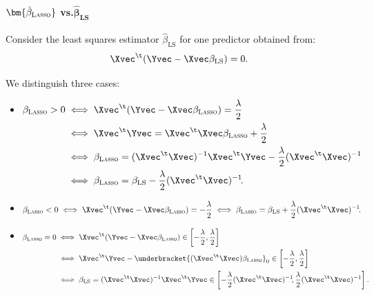 \paragraph{$\bm{\hat{\beta}_{\textsc{Lasso}}}$ vs.\@ $\bm{\hat{\beta}_{\text{LS}}}$}

Consider the least squares estimator $\hat{\beta}_{\text{LS}}$ for one predictor obtained from:
\begin{equation}
    \Xvec^\t(\Yvec - \Xvec\beta_{\text{LS}}) = 0.
\end{equation}

We distinguish three cases:
\begin{itemize}
    \item $\begin{aligned}[t]
                  \beta_{\textsc{Lasso}} > 0 & \iff \Xvec^\t(\Yvec - \Xvec\beta_{\textsc{Lasso}}) = \frac{\lambda}{2}                                    \\
                                             & \iff \Xvec^\t \Yvec = \Xvec^\t \Xvec\beta_{\textsc{Lasso}} + \frac{\lambda}{2}                                \\
                                             & \iff \beta_{\textsc{Lasso}} = (\Xvec^\t \Xvec)^{-1} \Xvec^\t \Yvec - \frac{\lambda}{2} (\Xvec^\t \Xvec)^{-1}        \\
                                             & \iff \beta_{\textsc{Lasso}} = \beta_{\text{LS}} - \frac{\lambda}{2} (\Xvec^\t \Xvec)^{-1}\negthinspace.
              \end{aligned}$
    \item $\begin{aligned}
                  \beta_{\textsc{Lasso}} < 0 & \iff \Xvec^\t(\Yvec - \Xvec\beta_{\textsc{Lasso}}) = -\frac{\lambda}{2} \iff \beta_{\textsc{Lasso}} = \beta_{\text{LS}} + \frac{\lambda}{2} (\Xvec^\t \Xvec)^{-1}\negthinspace.
              \end{aligned}$
    \item $\begin{aligned}[t]
                  \beta_{\textsc{Lasso}} = 0 & \iff \Xvec^\t(\Yvec - \Xvec\beta_{\textsc{Lasso}}) \in \left[-\frac{\lambda}{2}, \frac{\lambda}{2}\right]                                     \\
                                             & \iff \Xvec^\t \Yvec - \underbracket{(\Xvec^\t \Xvec) \beta_{\textsc{Lasso}}}_{0} \in \left[-\frac{\lambda}{2}, \frac{\lambda}{2}\right]           \\
                                             & \iff \beta_{\text{LS}} = (\Xvec^\t \Xvec)^{-1} \Xvec^\t \Yvec \in \left[-\frac{\lambda}{2} (\Xvec^\t \Xvec)^{-1}\negmedspace, \frac{\lambda}{2} (\Xvec^\t \Xvec)^{-1}\right].
              \end{aligned}$
\end{itemize}

